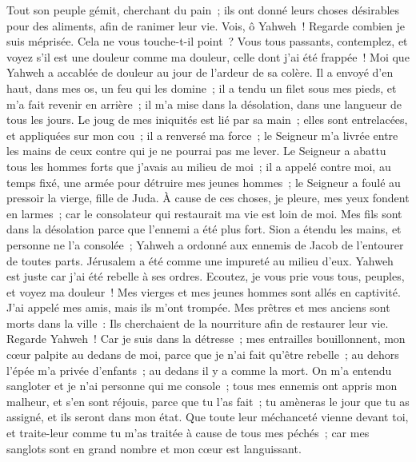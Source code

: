 \begin{multicols}{2}
 Tout son peuple gémit, cherchant du pain~; ils ont donné leurs choses désirables pour des aliments, afin de ranimer leur vie. Vois, ô Yahweh~! Regarde combien je suis méprisée.
 Cela ne vous touche-t-il point~? Vous tous passants, contemplez, et voyez s'il est une douleur comme ma douleur, celle dont j'ai été frappée~! Moi que Yahweh a accablée de douleur au jour de l'ardeur de sa colère.
 Il a envoyé d'en haut, dans mes os, un feu qui les domine~; il a tendu un filet sous mes pieds, et m'a fait revenir en arrière~; il m'a mise dans la désolation, dans une langueur de tous les jours.
 Le joug de mes iniquités est lié par sa main~; elles sont entrelacées, et appliquées sur mon cou~; il a renversé ma force~; le Seigneur m'a livrée entre les mains de ceux contre qui je ne pourrai pas me lever.
 Le Seigneur a abattu tous les hommes forts que j'avais au milieu de moi~; il a appelé contre moi, au temps fixé, une armée pour détruire mes jeunes hommes~; le Seigneur a foulé au pressoir la vierge, fille de Juda.
 À cause de ces choses, je pleure, mes yeux fondent en larmes~; car le consolateur qui restaurait ma vie est loin de moi. Mes fils sont dans la désolation parce que l'ennemi a été plus fort.
 Sion a étendu les mains, et personne ne l'a consolée~; Yahweh a ordonné aux ennemis de Jacob de l'entourer de toutes parts. Jérusalem a été comme une impureté au milieu d'eux.
 Yahweh est juste car j'ai été rebelle à ses ordres. Ecoutez, je vous prie vous tous, peuples, et voyez ma douleur~! Mes vierges et mes jeunes hommes sont allés en captivité.
 J'ai appelé mes amis, mais ils m'ont trompée. Mes prêtres et mes anciens sont morts dans la ville~: Ils cherchaient de la nourriture afin de restaurer leur vie.
 Regarde Yahweh~! Car je suis dans la détresse~; mes entrailles bouillonnent, mon cœur palpite au dedans de moi, parce que je n'ai fait qu'être rebelle~; au dehors l'épée m'a privée d'enfants~; au dedans il y a comme la mort. 
 On m'a entendu sangloter et je n'ai personne qui me console~; tous mes ennemis ont appris mon malheur, et s'en sont réjouis, parce que tu l'as fait~; tu amèneras le jour que tu as assigné, et ils seront dans mon état.
Que toute leur méchanceté vienne devant toi, et traite-leur comme tu m'as traitée à cause de tous mes péchés~; car mes sanglots sont en grand nombre et mon cœur est languissant. 

\end{multicols}
